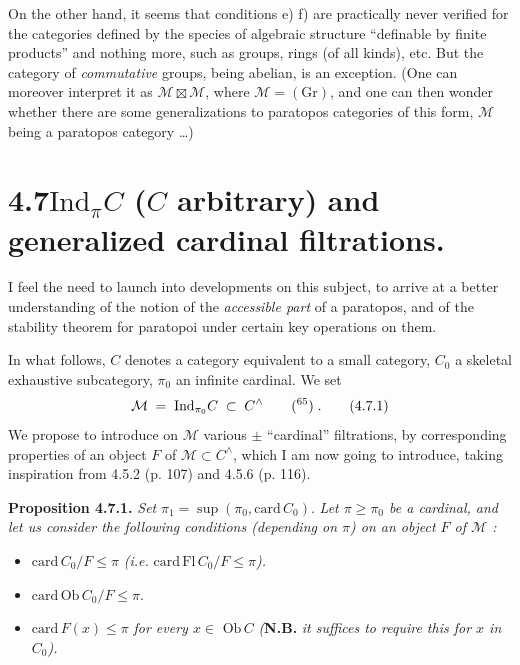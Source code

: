 \documentclass[11pt]{article}
\newcommand{\msp}[1]{\marginpar{\footnotesize [#1]}}
\newcommand{\Mc}{\mathcal{M}}
\begin{document}
\msp{page 160}

On the other hand, it seems that conditions e) f) are practically never verified for the categories defined by the species of algebraic structure ``definable by finite products'' and nothing more, such as groups, rings (of all kinds), etc. But the category of \textit{commutative} groups, being abelian, is an exception. (One can moreover interpret it as $\Mc \boxtimes \Mc$, where $\Mc = (\mathrm{Gr})$, and one can then wonder whether there are some generalizations to paratopos categories of this form, $\Mc$ being a paratopos category \ldots) %

\msp{page 161}

\section*{4.7\quad $\mathrm{Ind}_{\pi}C$ ($C$ arbitrary) and generalized cardinal filtrations.}

I feel the need to launch into developments on this subject, to arrive at a better understanding of the notion of the \textit{accessible part} of a paratopos, and of the stability theorem for paratopoi under certain key operations on them.

In what follows, $C$ denotes a category equivalent to a small category, $C_0$ a skeletal exhaustive subcategory, $\pi_0$ an infinite cardinal. We set
\[
\Mc \;=\; \mathrm{Ind}_{\pi_0}C \;\subset\; C^{\wedge} \qquad \text{(\footnotemark[65])}\;. \tag*{(4.7.1)}
\]
We propose to introduce on $\Mc$ various $\pm$ ``cardinal'' filtrations, by corresponding properties of an object $F$ of $\Mc \subset C^{\wedge}$, which I am now going to introduce, taking inspiration from 4.5.2 (p. 107) and 4.5.6 (p. 116).

\textbf{Proposition 4.7.1.} \textit{Set} $\pi_1 = \sup(\pi_0, \mathrm{card}\, C_0)$. \textit{Let $\pi \geqslant \pi_0$ be a cardinal, and let us consider the following conditions (depending on $\pi$) on an object $F$ of $\Mc$ :}
\begin{itemize}[leftmargin=4em]
\item[\textit{a)}] $\mathrm{card}\, C_0/F \leqslant \pi$ \textit{(i.e.} $\mathrm{card}\,\mathrm{Fl}\, C_0/F \leqslant \pi$\textit{).}
\item[\textit{a$'$)}] $\mathrm{card}\,\mathrm{Ob}\, C_0/F \leqslant \pi$.
\item[\textit{a$''$)}] $\mathrm{card}\, F(x) \leqslant \pi$ \textit{for every $x \in$} $\mathrm{Ob}\, C$ \textit{(}\textbf{N.B.} \textit{it suffices to require this for $x$ in $C_0$).}
\end{itemize}
\end{document}
